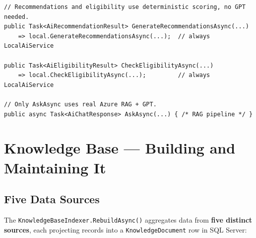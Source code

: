 \documentclass[11pt,a4paper]{article}
\begin{document}
\begin{lstlisting}[language={[Sharp]C},caption={AzureOpenAiService.cs --- delegation}]
// Recommendations and eligibility use deterministic scoring, no GPT needed.
public Task<AiRecommendationResult> GenerateRecommendationsAsync(...)
    => local.GenerateRecommendationsAsync(...);  // always LocalAiService

public Task<AiEligibilityResult> CheckEligibilityAsync(...)
    => local.CheckEligibilityAsync(...);         // always LocalAiService

// Only AskAsync uses real Azure RAG + GPT.
public async Task<AiChatResponse> AskAsync(...) { /* RAG pipeline */ }
\end{lstlisting}

\section{Knowledge Base --- Building and Maintaining It}

\subsection{Five Data Sources}

The \texttt{KnowledgeBaseIndexer.RebuildAsync()} aggregates data from
\textbf{five distinct sources}, each projecting records into a
\texttt{KnowledgeDocument} row in SQL Server:
\end{document}
